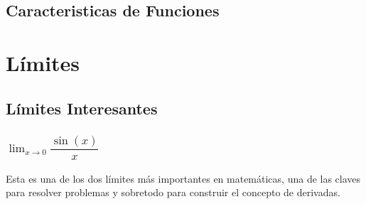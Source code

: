 \documentclass[12pt, fleqn]{report}                             %
\theoremstyle{break}                                            %
\newcommand{\Wrap}[1]           {\left( #1 \right)}             %
\newcommand{\Sin}[1] {\sin\Wrap{#1}}                            %
\begin{document}
                

        \section{Caracteristicas de Funciones}

            



    \chapter{Límites}
        \clearpage

        \section{Límites Interesantes}

            \subsection{$\lim_{x \to 0} \dfrac{\Sin{x}}{x}$}

                Esta es una de los dos límites más importantes en matemáticas, una de las claves para 
                resolver problemas y sobretodo para construir el concepto de derivadas.
\end{document}
